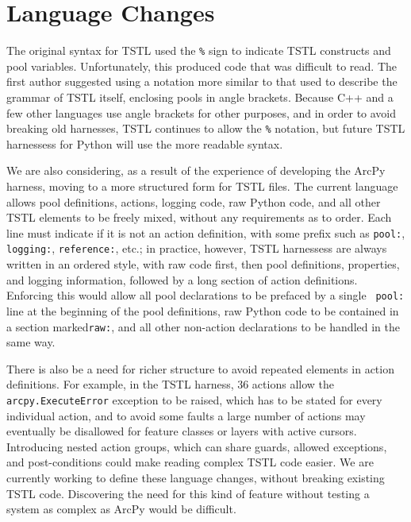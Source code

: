 \section{Language Changes}

The original syntax for TSTL \cite{NFM15} used the {\tt \%} sign to
indicate TSTL constructs and pool variables.  Unfortunately, this
produced code that was difficult to read.  The first author suggested
using a notation more similar to that used to describe the grammar of
TSTL itself, enclosing pools in angle brackets.  Because C++ and a few
other languages use angle brackets for other purposes, and in order to
avoid breaking old harnesses, TSTL continues to allow the {\tt \%}
notation, but future TSTL harnessess for Python will use the more
readable syntax.

We are also considering, as a result of the experience of developing
the ArcPy harness, moving to a more structured form for TSTL files.
The current language allows pool definitions, actions, logging code,
raw Python code, and all other TSTL elements to be freely mixed,
without any requirements as to order.  Each line must indicate if it
is not an action definition, with some prefix such as {\tt pool:},
{\tt logging:}, {\tt reference:}, etc.; in practice, however, TSTL
harnessess are always written in an ordered style, with raw code
first, then pool definitions, properties, and logging information,
followed by a long section of action definitions.  Enforcing this
would allow all pool declarations to be prefaced by a single {\tt
  pool:} line at the beginning of the pool definitions, raw Python
code to be contained in a section marked{\tt raw:}, and all other
non-action declarations to be handled in the same way. 

There is also be a need for richer structure to avoid repeated
elements in action definitions.  For example, in the TSTL harness, 36
actions allow the {\tt arcpy.ExecuteError} exception to be raised,
which has to be stated for every individual action, and to avoid some
faults a large number of actions may eventually be disallowed for
feature classes or layers with active cursors.  Introducing
nested action groups, which can share guards, allowed exceptions, and post-conditions
could make reading complex TSTL code easier.  We are currently working to
define these language changes, without breaking existing TSTL code.
Discovering the need for this kind of feature without testing a system
as complex as ArcPy would be difficult.
